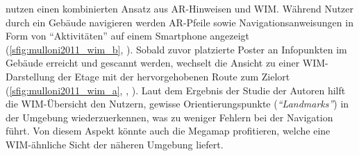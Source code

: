 \textcites{Mulloni2011a}{Mulloni2012} nutzen einen kombinierten Ansatz aus AR-Hinweisen und WIM.\@
Während Nutzer durch ein Gebäude navigieren werden AR-Pfeile sowie Navigationsanweisungen in Form von \enquote{Aktivitäten} auf einem Smartphone angezeigt (\autoref{sfig:mulloni2011_wim_b}, ).
Sobald zuvor platzierte Poster an Infopunkten im Gebäude erreicht und gescannt werden, wechselt die Ansicht zu einer WIM-Darstellung der Etage mit der hervorgehobenen Route zum Zielort (\autoref{sfig:mulloni2011_wim_a}, , ).
Laut dem Ergebnis der Studie der Autoren hilft die WIM-Übersicht den Nutzern, gewisse Orientierungspunkte (\emph{\enquote{Landmarks}}) in der Umgebung wiederzuerkennen, was zu weniger Fehlern bei der Navigation führt.
Von diesem Aspekt könnte auch die Megamap profitieren, welche eine WIM-ähnliche Sicht der näheren Umgebung liefert.
